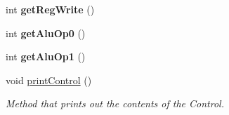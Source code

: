 \begin{DoxyCompactItemize}
int {\bfseries get\+Reg\+Write} ()
\item 
\mbox{\label{class_control_unit_a5f88deaa3119aa38812edd8cf1d75b70}} 
int {\bfseries get\+Alu\+Op0} ()
\item 
\mbox{\label{class_control_unit_abeb8981fe2c90430b6aca8fa14ae9cab}} 
int {\bfseries get\+Alu\+Op1} ()
\item 
\mbox{\label{class_control_unit_a103986a57f14e0b13da4e5785d8bb034}} 
void \mbox{\hyperlink{class_control_unit_a103986a57f14e0b13da4e5785d8bb034}{print\+Control}} ()
\begin{DoxyCompactList}\small\item\em Method that prints out the contents of the Control. \end{DoxyCompactList}\end{DoxyCompactItemize}
